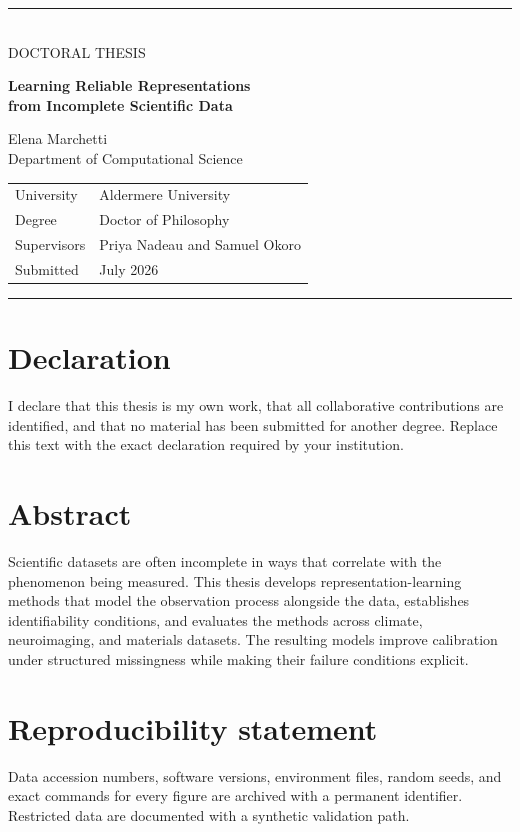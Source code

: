 \documentclass[11pt,twoside,openany,headings=small]{scrbook}
\begin{document}
\begin{titlepage}
\raggedright
\vspace*{1.1in}
{\color{accent}\rule{\textwidth}{2pt}}\\[1.5em]
{\fontsize{13}{16}\selectfont DOCTORAL THESIS}\\[1.2em]
{\fontsize{30}{36}\selectfont\bfseries Learning Reliable Representations\\
from Incomplete Scientific Data\par}
\vspace{1.5em}
{\Large Elena Marchetti}\\[0.4em]
{\large Department of Computational Science}

\vfill
\begin{tabular}{@{}ll@{}}
University & Aldermere University \\
Degree & Doctor of Philosophy \\
Supervisors & Priya Nadeau and Samuel Okoro \\
Submitted & July 2026 \\
\end{tabular}
\vspace{0.8in}
{\color{accent}\rule{\textwidth}{0.6pt}}
\end{titlepage}

\frontmatter
\chapter*{Declaration}
I declare that this thesis is my own work, that all collaborative contributions
are identified, and that no material has been submitted for another degree.
Replace this text with the exact declaration required by your institution.

\chapter*{Abstract}
Scientific datasets are often incomplete in ways that correlate with the
phenomenon being measured. This thesis develops representation-learning
methods that model the observation process alongside the data, establishes
identifiability conditions, and evaluates the methods across climate,
neuroimaging, and materials datasets. The resulting models improve calibration
under structured missingness while making their failure conditions explicit.

\chapter*{Reproducibility statement}
Data accession numbers, software versions, environment files, random seeds,
and exact commands for every figure are archived with a permanent identifier.
Restricted data are documented with a synthetic validation path.
\end{document}
